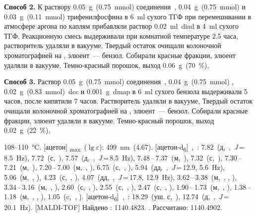\textbf{Способ 2.}
К раствору \SI{0.05}{\gram}~(\SI{0.75}{\milli\mole}) соединения~, \SI{0.04}{\gram}~(\SI{0.75}{\milli\mole})  и \SI{0.03}{\gram}~(\SI{0.11}{\milli\mole}) трифенилфосфина в \SI{6}{\milli\litre} сухого ТГФ при перемешивании в атмосфере аргона по каплям прибавляли раствор \SI{0.02}{\milli\litre}~\ac{diad} в \SI{4}{\milli\litre} сухого ТГФ. Реакционную смесь выдерживали при комнатной температуре 2.5 часа, растворитель удаляли в вакууме. Твердый остаток очищали колоночной хроматографией на , элюент~--- бензол. Собирали красные фракции, элюент удаляли в вакууме. Темно-красный порошок, выход \SI{0.06}{\gram}~(\SI{70}{\percent}).

\textbf{Способ 3.}
Раствор \SI{0.05}{\gram}~(\SI{0.75}{\milli\mole}) соединения~, \SI{0.04}{\gram}~(\SI{0.75}{\milli\mole}) , \SI{0.02}{\gram}~(\SI{0.83}{\milli\mole})~\ac{dcc} и \SI{0.001}{\gram}~\ac{dmap} в \SI{6}{\milli\litre} сухого бензола выдерживали 5 часов, после кипятили 7 часов. Растворитель удаляли в вакууме, Твердый остаток очищали колоночной хроматографией на , элюент~--- бензол. Собирали красные фракции, элюент удаляли в вакууме. Темно-красный порошок, выход \SI{0.02}{\gram}~(\SI{22}{\percent}).
\begin{experimental}
     108--\SI{110}{\celsius}.
    [ацетон] \chemlambda\textsubscript{max}~($\lg \varepsilon$): \SI{499}{\nano\metre}~(4.67).
    [ацетон-d\textsubscript{6}]~\chemdelta,~\si{\ppm}: 7.82~(д,~,~\textit{J}\,=\,8.5~\si{\hertz}), 7.72~(с,~), 7.57~(д,~,~\textit{J}\,=\,8.5~\si{\hertz}), 7.48\,--\,7.37~(м,~), 7.32~(с,~), 7.30\,--\,7.21~(м,~), 7.20\,--\,7.00~(м,~, ), 6.75~(с,~, ), 5.94~(дд,~,~\textit{J}\,=\,12.9, 5.6~\si{\hertz}), 5.06~(м,~, ), 4.23~(с,~, ), 4.07~(дд,~,~\textit{J}\,=\,17.8, 12.9~\si{\hertz}), 3.62\,--\,3.38~(м,~, , ), 3.34\,--\,3.16~(м,~, ), 2.60~(с,~, ), 2.55~(с,~, ), 2.47~(с,~, ), 1.90\,--\,1.73~(м,~, ), 1.38\,--\,1.18~(м,~, , ), 1.05~(c,~, ).
    [ацетон-d\textsubscript{6}]~\chemdelta,~\si{\ppm}: 18.29~(уш. с,~), 12.74~(д,~,~\textit{J}\,=\,20.1~\si{\hertz}).
    [MALDI-TOF] Найдено \ce{[M + H]+}: \num{1140.4823}. . Рассчитано: \ce{[M + H]} \num{1140.4902}.
\end{experimental}

